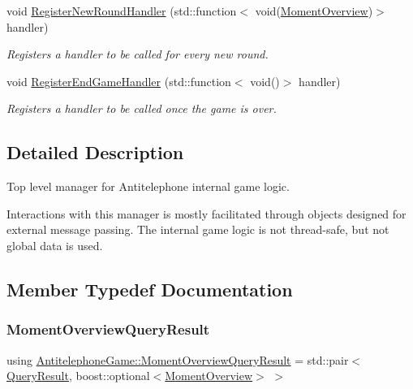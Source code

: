 \begin{DoxyCompactItemize}
void \hyperlink{class_antitelephone_game_a6a5a7e47e245313b53e076fac30ec4d3}{Register\+New\+Round\+Handler} (std\+::function$<$ void(\hyperlink{classexternal_1_1_moment_overview}{Moment\+Overview})$>$ handler)
\begin{DoxyCompactList}\small\item\em Registers a handler to be called for every new round. \end{DoxyCompactList}\item 
void \hyperlink{class_antitelephone_game_ab02a45cc50f47680560b541f0d4aeef2}{Register\+End\+Game\+Handler} (std\+::function$<$ void()$>$ handler)
\begin{DoxyCompactList}\small\item\em Registers a handler to be called once the game is over. \end{DoxyCompactList}\end{DoxyCompactItemize}


\subsection{Detailed Description}
Top level manager for Antitelephone internal game logic. 

Interactions with this manager is mostly facilitated through objects designed for external message passing. The internal game logic is not thread-\/safe, but not global data is used. 

\subsection{Member Typedef Documentation}
\mbox{\label{class_antitelephone_game_a99ab937cb4918da1c80bd8d07e43f920}} 
\subsubsection{\texorpdfstring{Moment\+Overview\+Query\+Result}{MomentOverviewQueryResult}}
{\footnotesize\ttfamily using \hyperlink{class_antitelephone_game_a99ab937cb4918da1c80bd8d07e43f920}{Antitelephone\+Game\+::\+Moment\+Overview\+Query\+Result} =  std\+::pair$<$\hyperlink{class_query_result}{Query\+Result}, boost\+::optional$<$\hyperlink{classexternal_1_1_moment_overview}{Moment\+Overview}$>$ $>$}

